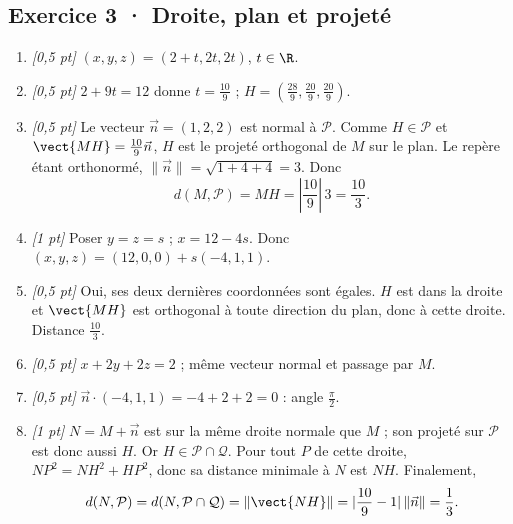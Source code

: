 \subsection*{Exercice 3 · Droite, plan et projeté}\begin{enumerate}

\item \textit{[0,5 pt]} $(x,y,z)=(2+t,2t,2t)$, $t\in\R$.

\item \textit{[0,5 pt]} $2+9t=12$ donne $t=\frac{10}{9}$ ; $H=(\frac{28}{9},\frac{20}{9},\frac{20}{9})$.

\item \textit{[0,5 pt]} Le vecteur $\vec n=(1,2,2)$ est normal à $\mathcal P$. Comme $H\in\mathcal P$ et $\vect{MH}=\frac{10}{9}\vec n$, $H$ est le projeté orthogonal de $M$ sur le plan. Le repère étant orthonormé, $\|\vec n\|=\sqrt{1+4+4}=3$. Donc
\[d(M,\mathcal P)=MH=|\frac{10}{9}|\,3=\frac{10}{3}.\]

\item \textit{[1 pt]} Poser $y=z=s$ ; $x=12-4s$. Donc $(x,y,z)=(12,0,0)+s(-4,1,1)$.

\item \textit{[0,5 pt]} Oui, ses deux dernières coordonnées sont égales. $H$ est dans la droite et $\vect{MH}$ est orthogonal à toute direction du plan, donc à cette droite. Distance $\frac{10}{3}$.

\item \textit{[0,5 pt]} $x+2y+2z=2$ ; même vecteur normal et passage par $M$.

\item \textit{[0,5 pt]} $\vec n\cdot(-4,1,1)=-4+2+2=0$ : angle $\frac{\pi}{2}$.

\item \textit{[1 pt]} $N=M+\vec n$ est sur la même droite normale que $M$ ; son projeté sur $\mathcal P$ est donc aussi $H$. Or $H\in\mathcal P\cap\mathcal Q$. Pour tout $P$ de cette droite, $NP^2=NH^2+HP^2$, donc sa distance minimale à $N$ est $NH$. Finalement,
\[d(N,\mathcal P)=d(N,\mathcal P\cap\mathcal Q)=\|\vect{NH}\|=|\frac{10}{9}-1|\,\|\vec n\|=\frac{1}{3}.\]

\end{enumerate}

